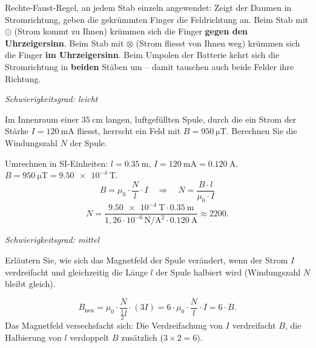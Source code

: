 \documentclass[addpoints,11pt,a4paper]{exam}
\newlength{\antwortraumlen}
\newcommand{\Antwortraum}[1]{%
  \pgfmathsetlength{\antwortraumlen}{#1*2.5cm}%
  \begin{answerbox}
    \rule{0pt}{\antwortraumlen}%
  \end{answerbox}%
}
\newcommand{\Schwierigkeit}[1]{%
  \textit{\color{darkgray}Schwierigkeitsgrad: #1}\par\smallskip
}
\begin{document}
\begin{questions}
\begin{taskbox}
\begin{solution}
\begin{center}
\begin{minipage}[t]{6.3cm}
\end{minipage}
\end{center}
Rechte-Faust-Regel, an jedem Stab einzeln angewendet: Zeigt der Daumen in
Stromrichtung, geben die gekrümmten Finger die Feldrichtung an. Beim Stab
mit $\odot$ (Strom kommt zu Ihnen) krümmen sich die Finger \textbf{gegen
den Uhrzeigersinn}. Beim Stab mit $\otimes$ (Strom fliesst von Ihnen weg)
krümmen sich die Finger \textbf{im Uhrzeigersinn}. Beim Umpolen der
Batterie kehrt sich die Stromrichtung in \textbf{beiden} Stäben um --
damit tauschen auch beide Felder ihre Richtung.
\end{solution}
\end{taskbox}
\end{questions}

\begin{questions}
\begin{taskbox}
\Schwierigkeit{leicht}
\question[3] Im Innenraum einer $\SI{35}{\centi\meter}$ langen,
luftgefüllten Spule, durch die ein Strom der Stärke $I=\SI{120}{\milli\ampere}$
fliesst, herrscht ein Feld mit $B=\SI{950}{\micro\tesla}$. Berechnen Sie
die Windungszahl $N$ der Spule.
\Antwortraum{3}
\begin{solution}
Umrechnen in SI-Einheiten: $l=\SI{0.35}{\meter}$,
$I=\SI{120}{\milli\ampere}=\SI{0.120}{\ampere}$,
$B=\SI{950}{\micro\tesla}=\SI{9.50e-4}{\tesla}$.
\[
  B = \mu_0\cdot\frac{N}{l}\cdot I
  \quad\Longrightarrow\quad
  N = \frac{B\cdot l}{\mu_0\cdot I}
\]
\[
  N = \frac{\SI{9.50e-4}{\tesla}\cdot\SI{0.35}{\meter}}{1{,}26\cdot10^{-6}\,\si{\newton\per\ampere\squared}\cdot\SI{0.120}{\ampere}}
    \approx 2200.
\]
\end{solution}
\end{taskbox}
\end{questions}

\begin{questions}
\begin{taskbox}
\Schwierigkeit{mittel}
\question[2] Erläutern Sie, wie sich das Magnetfeld der Spule verändert,
wenn der Strom $I$ verdreifacht und gleichzeitig die Länge $l$ der Spule
halbiert wird (Windungszahl $N$ bleibt gleich).
\Antwortraum{2}
\begin{solution}
\[
  B_{\text{neu}} = \mu_0\cdot\frac{N}{\frac{1}{2}l}\cdot(3I) = 6\cdot\mu_0\cdot\frac{N}{l}\cdot I = 6\cdot B.
\]
Das Magnetfeld versechsfacht sich: Die Verdreifachung von $I$ verdreifacht
$B$, die Halbierung von $l$ verdoppelt $B$ zusätzlich ($3\times2=6$).
\end{solution}
\end{taskbox}
\end{questions}
\end{document}
